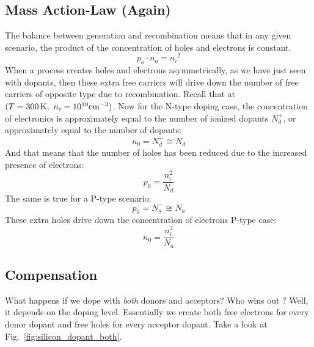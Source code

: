 \subsection{Mass Action-Law (Again)}
 
The balance between generation and recombination means that in any given scenario, the product of the concentration of holes and electrons is constant.  
\begin{equation}
        {p_o} \cdot {n_o} = {n_i}^2
\end{equation} 
When a process creates holes and electrons asymmetrically, as we have just seen with dopants, then these extra free carriers will drive down the number of free carriers of opposite type due to recombination.   Recall that at $(T = 300\,{\rm{K}},\,\,{n_i} = {10^{10}}{\rm{c}}{{\rm{m}}^{ - 3}})$.  Now for the N-type doping case, the concentration of electronics is approximately equal to the number of ionized dopants $N_d^+$, or approximately equal to the number of dopants:
\begin{equation}
{n_0} = N_d^+  \cong {N_d}
\end{equation}
And that means that the number of holes has been reduced due to the increased presence of electrons:
\begin{equation}
        p_0 = \frac{n_i^2}{N_d}
\end{equation}
The same is true for a P-type scenario:
\begin{equation}
{p_0} = N_a^ -  \cong {N_a} 
\end{equation}
These extra holes drive down the concentration of electrons 
{ P-type case:} \begin{equation}
        n_0 = \frac{n_i^2}{N_a}
\end{equation}




\subsection{Compensation}




What happens if we dope with \textit{both} donors and acceptors?  Who wins out ?  Well, it depends on the doping level.  Essentially we create both free electrons for every donor dopant and free holes for every acceptor dopant.  Take a look at Fig.~\ref{fig:silicon_dopant_both}.




